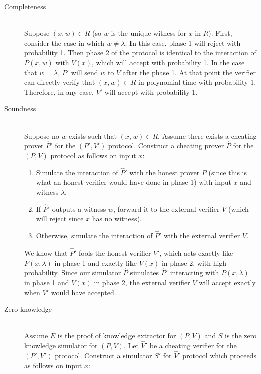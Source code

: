 \documentclass[draft]{article}
\begin{document}
\begin{enumerate}
  \begin{description}
  \item[Completeness] \hfill \\
    Suppose $(x, w)\in R$ (so $w$ is the unique witness for $x$ in $R$).
    First, consider the case in which $w\neq\lambda$.
    In this case, phase 1 will reject with probability 1.
    Then phase 2 of the protocol is identical to the interaction of $P(x, w)$ with $V(x)$, which will accept with probability 1.
    In the case that $w=\lambda$, $P'$ will send $w$ to $V$ after the phase 1.
    At that point the verifier can directly verify that $(x, w)\in R$ in polynomial time with probability 1.
    Therefore, in any case, $V'$ will accept with probability 1.
  \item[Soundness] \hfill \\
    Suppose no $w$ exists such that $(x, w)\in R$.
    Assume there exists a cheating prover $\hat{P}'$ for the $(P', V')$ protocol.
    Construct a cheating prover $\hat{P}$ for the $(P, V)$ protocol as follows on input $x$:
    \begin{enumerate}
    \item Simulate the interaction of $\hat{P}'$ with the honest prover $P$ (since this is what an honest verifier would have done in phase 1) with input $x$ and witness $\lambda$.
    \item If $\hat{P}'$ outputs a witness $w$, forward it to the external verifier $V$ (which will reject since $x$ has no witness).
    \item Otherwise, simulate the interaction of $\hat{P}'$ with the external verifier $V$.
    \end{enumerate}
    We know that $\hat{P}'$ fools the honest verifier $V'$, which acts exactly like $P(x, \lambda)$ in phase 1 and exactly like $V(x)$ in phase 2, with high probability.
    Since our simulator $\hat{P}$ simulates $\hat{P}'$ interacting with $P(x, \lambda)$ in phase 1 and $V(x)$ in phase 2, the external verifier $V$ will accept exactly when $V'$ would have accepted.
  \item[Zero knowledge] \hfill \\
    Assume $E$ is the proof of knowledge extractor for $(P, V)$ and $S$ is the zero knowledge simulator for $(P, V)$.
    Let $\hat{V}'$ be a cheating verifier for the $(P', V')$ protocol.
    Construct a simulator $S'$ for $\hat{V}'$ protocol which proceeds as follows on input $x$:
    \begin{enumerate}

\end{enumerate}
\end{description}
\end{enumerate}
\end{document}
